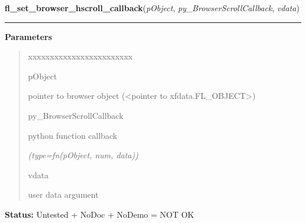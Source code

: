 \hspace{.8\funcindent}\begin{boxedminipage}{\funcwidth}

    \raggedright \textbf{fl\_set\_browser\_hscroll\_callback}(\textit{pObject}, \textit{py\_BrowserScrollCallback}, \textit{vdata})

    \vspace{-1.5ex}

    \rule{\textwidth}{0.5\fboxrule}
\setlength{\parskip}{2ex}
\setlength{\parskip}{1ex}
      \textbf{Parameters}
      \vspace{-1ex}

      \begin{quote}
        \begin{Ventry}{xxxxxxxxxxxxxxxxxxxxxxxx}

          \item[pObject]

          pointer to browser object ({\textless}pointer to 
          xfdata.FL\_OBJECT{\textgreater})

          \item[py\_BrowserScrollCallback]

          python function callback

            {\it (type=fn(pObject, num, data))}

          \item[vdata]

          user data argument

        \end{Ventry}

      \end{quote}

\textbf{Status:} Untested + NoDoc + NoDemo = NOT OK



    \end{boxedminipage}

    \label{xformslib:library:fl_set_browser_vscroll_callback}

    \vspace{0.5ex}

